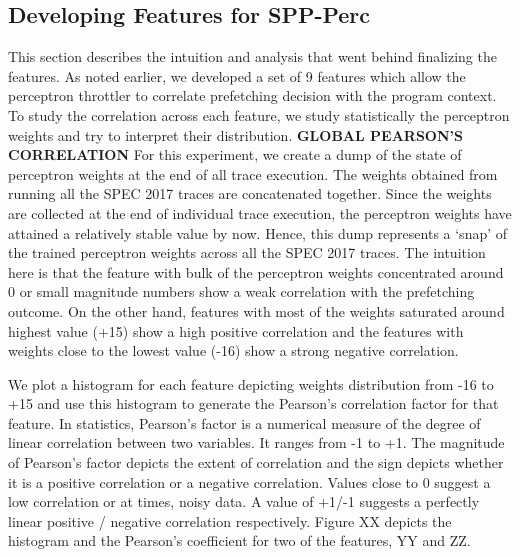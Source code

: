 \documentclass{sig-alternate}
\begin{document}
\subsection{Developing Features for SPP-Perc}
This section describes the intuition and analysis that went behind finalizing the features. 
As noted earlier, we developed a set of 9 features which allow the perceptron throttler to correlate prefetching decision with the program context. 
To study the correlation across each feature, we study statistically the perceptron weights and try to interpret their distribution.
\newline  \newline
\textbf{GLOBAL PEARSON'S CORRELATION}\newline
For this experiment, we create a dump of the state of perceptron weights at the end of all trace execution.
The weights obtained from running all the SPEC 2017 traces are concatenated together. 
Since the weights are collected at the end of individual trace execution, the perceptron weights have attained a relatively stable value by now.
Hence, this dump represents a `snap' of the trained perceptron weights across all the SPEC 2017 traces.
The intuition here is that the feature with bulk of the perceptron weights concentrated around 0 or small magnitude numbers show a weak correlation with the prefetching outcome. 
On the other hand, features with most of the weights saturated around highest value (+15) show a high positive correlation and the features with weights close to the lowest value (-16) show a strong negative correlation.

We plot a histogram for each feature depicting weights distribution from -16 to +15 and use this histogram to generate the Pearson's correlation factor for that feature.
In statistics, Pearson's factor is a numerical measure of the degree of linear correlation between two variables.
It ranges from -1 to +1.
The magnitude of Pearson's factor depicts the extent of correlation and the sign depicts whether it is a positive correlation or a negative correlation.
Values close to 0 suggest a low correlation or at times, noisy data.
A value of +1/-1 suggests a perfectly linear positive / negative correlation respectively.
Figure XX depicts the histogram and the Pearson's coefficient for two of the features, YY and ZZ.
\end{document}
